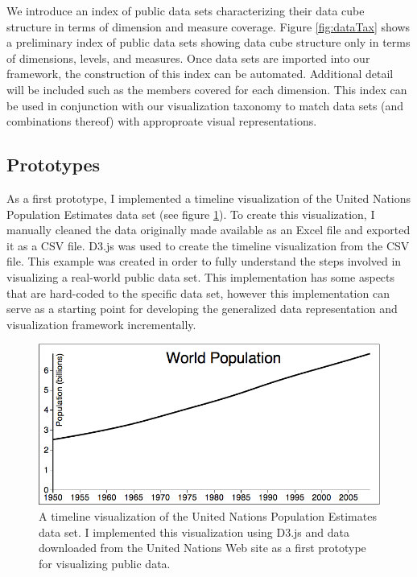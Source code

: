 \documentclass[12pt]{article}
\begin{document}
\begin{doublespace}
We introduce an index of public data sets characterizing their data cube structure in terms of dimension and measure coverage. Figure \ref{fig:dataTax} shows a preliminary index of public data sets showing data cube structure only in terms of dimensions, levels, and measures. Once data sets are imported into our framework, the construction of this index can be automated. Additional detail will be included such as the members covered for each dimension. This index can be used in conjunction with our visualization taxonomy to match data sets (and combinations thereof) with approproate visual representations.

\subsection{Prototypes}

As a first prototype, I implemented a timeline visualization of the United Nations Population Estimates data set (see figure \ref{fig:unTimeline}). To create this visualization, I manually cleaned the data originally made available as an Excel file and exported it as a CSV file. D3.js was used to create the timeline visualization from the CSV file. This example was created in order to fully understand the steps involved in visualizing a real-world public data set. This implementation has some aspects that are hard-coded to the specific data set, however this implementation can serve as a starting point for developing the generalized data representation and visualization framework incrementally.

\begin{figure}[h!]
  \centering
  \includegraphics[width=\textwidth]{figures/unTimeline.png}
  \caption[UN Population Timeline.]
   {A timeline visualization of the United Nations Population Estimates data set. I implemented this visualization using D3.js and data downloaded from the United Nations Web site as a first prototype for visualizing public data. }
  \label{fig:unTimeline}
\end{figure}


\end{doublespace}
\end{document}
